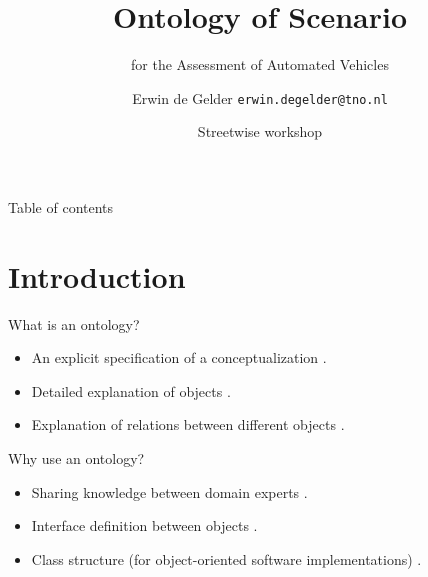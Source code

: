 \documentclass[aspectratio=\AspectR,10pt,compress,t]{beamer} %
\title[Ontology of Scenario | \insertsubtitle]{Ontology of Scenario}
\subtitle{for the Assessment of Automated Vehicles}
\author[deGelder]{Erwin de Gelder \texttt{erwin.degelder@tno.nl}}
\date[11th of January]{Streetwise workshop}
\begin{document}
{ %
\blacktitle                     %
\begin{frame}
    \titlepage
\end{frame}}

\begin{frame}{Table of contents}
	\tableofcontents
\end{frame}

\section{Introduction}
\begin{frame}{What is an ontology?}
	\begin{itemize}
		\item An explicit specification of a conceptualization \cite{gruber1993ontology}.
		\item Detailed explanation of objects \cite{vanDamPhDThesis2009}.
		\item Explanation of relations between different objects \cite{vanDamPhDThesis2009}.
	\end{itemize}
\end{frame}

\begin{frame}{Why use an ontology?}
	\begin{itemize}
		\item Sharing knowledge between domain experts \cite{vanDamPhDThesis2009}.
		\item Interface definition between objects \cite{vanDamPhDThesis2009}.
		\item Class structure (for object-oriented software implementations) \cite{vanDamPhDThesis2009}.
	\end{itemize}
\end{frame}
\end{document}
